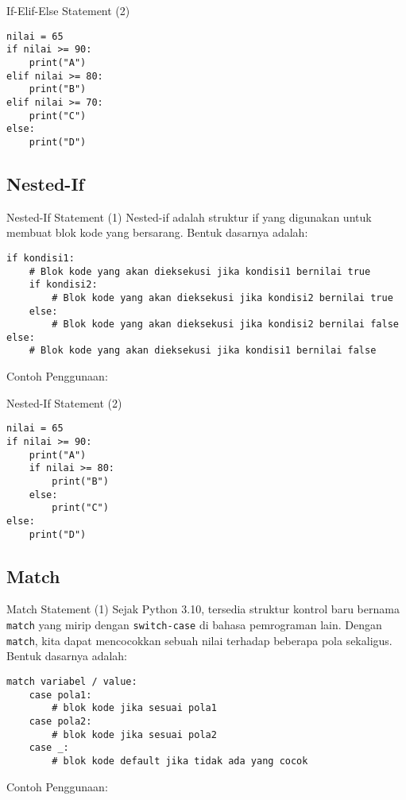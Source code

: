 \documentclass[aspectratio=169, table]{beamer}
\begin{document}
\begin{frame}[fragile]{If-Elif-Else Statement (2)}
\begin{lstlisting}[style=PythonStyle, caption={if_elif_else_statement.py}]
nilai = 65
if nilai >= 90:
    print("A")
elif nilai >= 80:
    print("B")
elif nilai >= 70:
    print("C")
else:
    print("D")
\end{lstlisting}
\end{frame}

\subsection{Nested-If}

\begin{frame}[fragile]{Nested-If Statement (1)}
Nested-if adalah struktur if yang digunakan untuk membuat blok kode yang bersarang. Bentuk dasarnya adalah:

\begin{lstlisting}[style=PythonStyle]
if kondisi1:
    # Blok kode yang akan dieksekusi jika kondisi1 bernilai true
    if kondisi2:
        # Blok kode yang akan dieksekusi jika kondisi2 bernilai true
    else:
        # Blok kode yang akan dieksekusi jika kondisi2 bernilai false
else:
    # Blok kode yang akan dieksekusi jika kondisi1 bernilai false
\end{lstlisting}

Contoh Penggunaan:
\end{frame}

\begin{frame}[fragile]{Nested-If Statement (2)}
\begin{lstlisting}[style=PythonStyle, caption={nested_if_statement.py}]
nilai = 65
if nilai >= 90:
    print("A")
    if nilai >= 80:
        print("B")
    else:
        print("C")
else:
    print("D")
\end{lstlisting}
\end{frame}

\subsection{Match}

\begin{frame}[fragile]{Match Statement (1)}
Sejak Python 3.10, tersedia struktur kontrol baru bernama \texttt{match} yang mirip dengan \texttt{switch-case} di bahasa pemrograman lain. Dengan \texttt{match}, kita dapat mencocokkan sebuah nilai terhadap beberapa pola sekaligus. Bentuk dasarnya adalah:

\begin{lstlisting}[style=PythonStyle]
match variabel / value:
    case pola1:
        # blok kode jika sesuai pola1
    case pola2:
        # blok kode jika sesuai pola2
    case _:
        # blok kode default jika tidak ada yang cocok
\end{lstlisting}

Contoh Penggunaan:
\end{frame}
\end{document}
